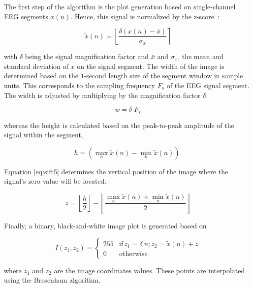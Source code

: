 \documentclass[brainsci,article,submit,moreauthors,pdftex,10pt,a4paper]{mdpi}
\begin{document}
The first step of the algorithm is the plot generation based on single-channel EEG segments $ x(n) $.  Hence, this signal is normalized by the z-score~\citep{Zhang2013}: 

\begin{equation}
\tilde{x}(n) = \left\lfloor \frac{\delta ( x(n) - \bar{x})}{\sigma_{x}} \right\rceil 
\label{eq:sift1}
\end{equation}

\noindent with $\delta$ being the signal magnification factor and $\bar{x}$ and $\sigma_{x}$, the mean and standard deviation of $x$ on the signal segment.  The width of the image is determined based on the $1$-second length size of the segment window in sample units. This corresponds to the sampling frequency $F_s$ of the EEG signal segment. The width is adjusted by multiplying by the magnification factor $\delta$, 

\begin{equation}
w = \delta \; F_s
\label{eq:sift2}
\end{equation}

\noindent whereas the height is calculated based on the peak-to-peak amplitude of the signal within the segment,

\begin{equation}
h = ( \max_{n} \tilde{x}(n) - \min_{n} \tilde{x}(n)).
\label{eq:sift4}
\end{equation}

Equation \ref{eq:sift5} determines the vertical position of the image where the signal's zero value will be located.

\begin{equation}
z = \left\lfloor \frac{h}{2} \right\rfloor - \left\lfloor \frac{\max_{n} \tilde{x}(n) + \min_{n} \tilde{x}(n)}{2} \right\rfloor
\label{eq:sift5}
\end{equation}

Finally, a binary, black-and-white image plot is generated based on

\begin{equation}
I(z_1,z_2) = \left\{ \begin{array}{rl}
255 & \text{if} \,  z_1 = \delta \  n; \! z_2 = \tilde{x}(n) + z \\
0   & \mbox{otherwise}
\end{array}\right.
\label{eq:sift6}
\end{equation}

\noindent where $z_1$ and $z_2$ are the image coordinates values.  These points are interpolated using the Bresenham algorithm.
\end{document}
